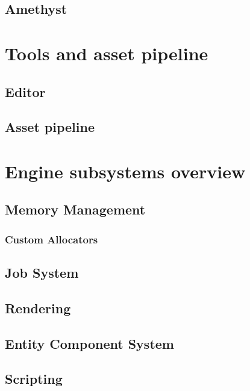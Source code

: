 \subsection{Amethyst}
\blindtext
\section{Tools and asset pipeline}
\blindtext
\subsection{Editor}
\blindtext
\subsection{Asset pipeline}
\blindtext
\section{Engine subsystems overview}
\blindtext
\subsection{Memory Management}
\blindtext
\subsubsection{Custom Allocators}
\blindtext
\subsection{Job System}
\blindtext
\subsection{Rendering}
\blindtext
\subsection{Entity Component System}
\blindtext
\subsection{Scripting}
\blindtext